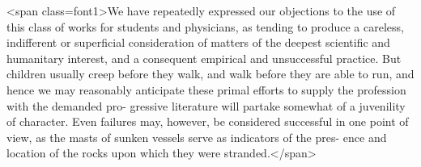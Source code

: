 <span class=font1>We have repeatedly expressed our objections to the use of this class
of works for students and physicians, as tending to produce a careless,
indifferent or superficial consideration of matters of the deepest scientific
and humanitary interest, and a consequent empirical and unsuccessful
practice. But children usually creep before they walk, and walk
before they are able to run, and hence we may reasonably anticipate
these primal efforts to supply the profession with the demanded pro-
gressive literature will partake somewhat of a juvenility of character.
Even failures may, however, be considered successful in one point of
view, as the masts of sunken vessels serve as indicators of the pres-
ence and location of the rocks upon which they were stranded.</span>
